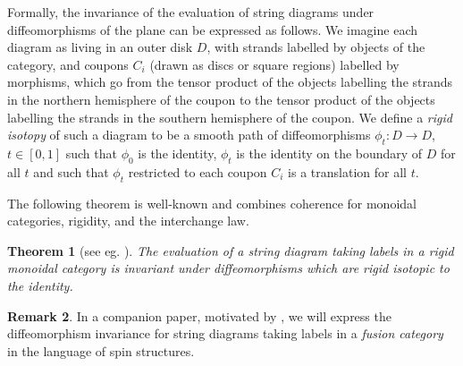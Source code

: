 \documentclass[a4paper]{article}
\theoremstyle{plain}
\newtheorem{thm}{Theorem}[section]
\theoremstyle{definition}
\newtheorem{rem}[thm]{Remark}
\begin{document}
Formally, the invariance of the evaluation of string diagrams under diffeomorphisms of the plane can be expressed as follows. We imagine each diagram as living in an outer disk $D$, with strands labelled by objects of the category, and coupons $C_i$ (drawn as discs or square regions) labelled by morphisms, which go from the tensor product of the objects labelling the strands in the northern hemisphere of the coupon to the tensor product of the objects labelling the strands in the southern hemisphere of the coupon. We define a {\em rigid isotopy} of such a diagram to be a smooth path of diffeomorphisms $\phi_t : D \rightarrow D$, $t \in [0,1]$ such that $\phi_0$ is the identity, $\phi_t$ is the identity on the boundary of $D$ for all $t$ and such that $\phi_t$ restricted to each coupon $C_i$ is a translation for all $t$.

The following theorem is well-known and combines coherence for monoidal categories, rigidity, and the interchange law.
\begin{thm}[{see eg. \cite{s11-sgc}}] \label{invariance_rigid}
The evaluation of a string diagram taking labels in a rigid monoidal category is invariant under diffeomorphisms which are rigid isotopic to the identity. 
\end{thm}
\begin{rem}
In a companion paper, motivated by \cite{kirillov2011-string-net}, we will express the diffeomorphism invariance for string diagrams taking labels in a {\em fusion category} in the language of spin structures. \label{spin_remark}
\end{rem}
\end{document}
